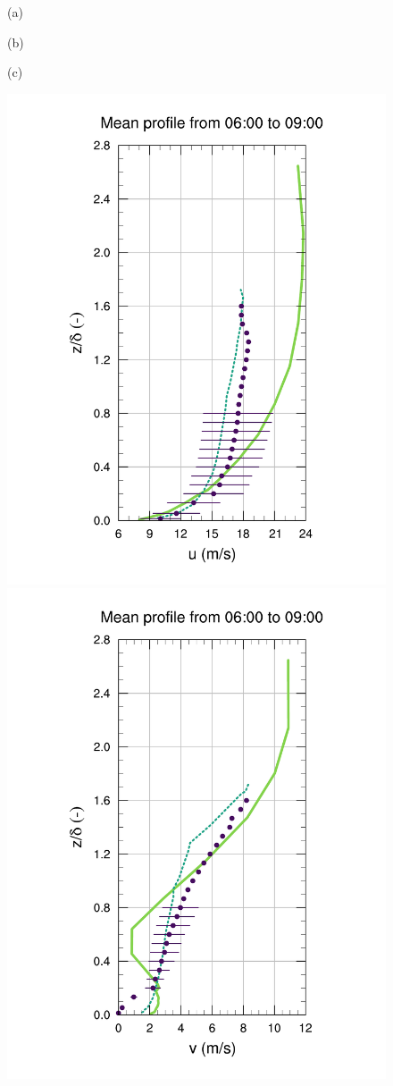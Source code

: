 \begin{figure}[H]
	\begin{minipage}{0.33\linewidth}
		\centering \hspace{1cm}(a)
	\end{minipage}%
	\begin{minipage}{0.33\linewidth}
		\centering \hspace{0.8cm}(b)
	\end{minipage}%
	\begin{minipage}{0.33\linewidth}
		\centering \hspace{1cm}(c)
	\end{minipage}%
	\vspace{-7mm}
	\begin{center}
	\includegraphics[height=0.61\linewidth,page=37,trim={35mm 10mm 38mm 25mm},clip]{Imagenes/06/hov_da/9u}%
	\includegraphics[height=0.61\linewidth,page=37,trim={48mm 10mm 38mm 25mm},clip]{Imagenes/06/hov_da/9v}%

\end{center}
\end{figure}

